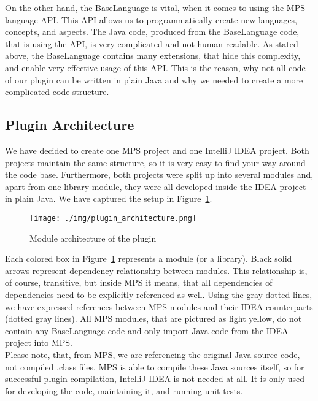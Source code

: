 On the other hand, the BaseLanguage is vital, when it comes to using the MPS language API.
This API allows us to programmatically create new languages, concepts, and aspects.
The Java code, produced from the BaseLanguage code, that is using the API, is very complicated and not human readable.
As stated above, the BaseLanguage contains many extensions, that hide this complexity, and enable very effective usage of this API.
This is the reason, why not all code of our plugin can be written in plain Java and why we needed to create a more complicated code structure.

\subsection{Plugin Architecture}

We have decided to create one MPS project and one IntelliJ IDEA project.
Both projects maintain the same structure, so it is very easy to find your way around the code base.
Furthermore, both projects were split up into several modules and, apart from one library module, they were all developed inside the IDEA project in plain Java.
We have captured the setup in Figure~\ref{fig:plugin_architecture}.

\begin{figure}[h]
	\centering
	\texttt{[image: ./img/plugin\_architecture.png]}
	\caption{Module architecture of the plugin}
	\label{fig:plugin_architecture}
\end{figure}

Each colored box in Figure~\ref{fig:plugin_architecture} represents a module (or a library).
Black solid arrows represent dependency relationship between modules.
This relationship is, of course, transitive, but inside MPS it means, that all dependencies of dependencies need to be explicitly referenced as well.
Using the gray dotted lines, we have expressed references between MPS modules and their IDEA counterparts (dotted gray lines).
All MPS modules, that are pictured as light yellow, do not contain any BaseLanguage code and only import Java code from the IDEA project into MPS.
\\

Please note, that, from MPS, we are referencing the original Java source code, not compiled .class files.
MPS is able to compile these Java sources itself, so for successful plugin compilation, IntelliJ IDEA is not needed at all.
It is only used for developing the code, maintaining it, and running unit tests.

